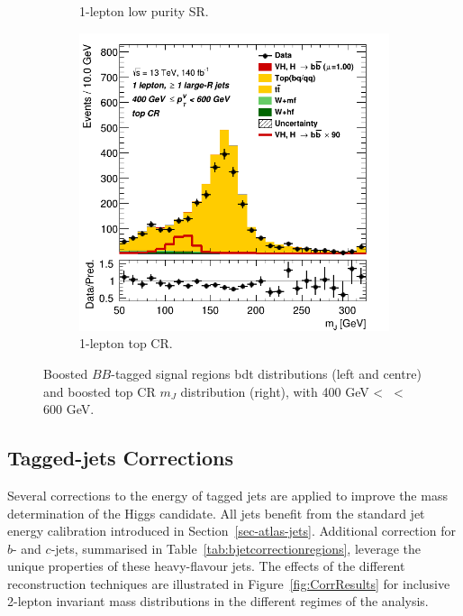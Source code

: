 \begin{figure}[h!]
\begin{subfigure}[b]{0.32\textwidth}
      \caption{1-lepton low purity SR.}
      \label{fig:plots_VHboost_ex_1L_SR}
  \end{subfigure}
  \begin{subfigure}[b]{0.32\textwidth}
    \centering
    \includegraphics[width=\textwidth]{Images/VH/Own_fit/prefit_VHbb/Region_distmBB_BMax600_BMin400_incFat1_Fat1_DSRtopaddbjetcr_J0_TTypebb_incJet1_T2_L1_Y6051_Prefit.png}
    \caption{1-lepton top CR.}
    \label{fig:plots_VHboost_ex_1L_top}
\end{subfigure}
  \caption{Boosted $BB$-tagged signal regions \gls{bdt} distributions (left and centre) and boosted top CR $m_J$ distribution (right), with 400 GeV < \ptv\ < 600 GeV.}
  \label{fig:plots_VHboost_ex}
\end{figure} 

\subsection{Tagged-jets Corrections}\label{sec-vh-jetcor}
Several corrections to the energy of tagged jets are applied to improve the mass determination of the Higgs candidate. All jets benefit from the standard jet energy calibration introduced in Section~\ref{sec-atlas-jets}. Additional correction for $b$- and $c$-jets, summarised in Table~\ref{tab:bjetcorrectionregions}, leverage the unique properties of these heavy-flavour jets. The effects of the different reconstruction techniques are illustrated in Figure~\ref{fig:CorrResults} for inclusive 2-lepton invariant mass distributions in the different regimes of the analysis. \\

